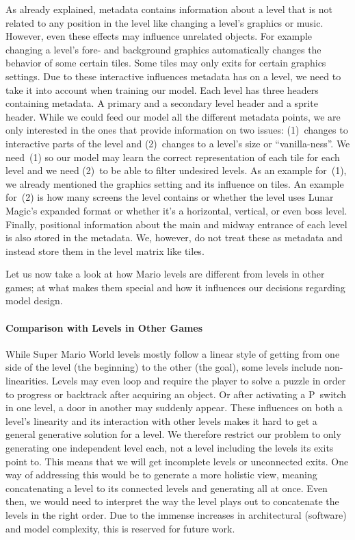 As already explained, metadata contains information about a level that
is not related to any position in the level like changing a level's
graphics or music. However, even these effects may influence unrelated
objects. For example changing a level's fore- and background graphics
automatically changes the behavior of some certain tiles. Some tiles
may only exits for certain graphics settings. Due to these interactive
influences metadata has on a level, we need to take it into account
when training our model. Each level has three headers containing
metadata. A primary and a secondary level header and a sprite header.
While we could feed our model all the different metadata points, we
are only interested in the ones that provide information on two
issues: (1)~changes to interactive parts of the level and (2)~changes
to a level's size or ``vanilla-ness''. We need~(1) so our model may
learn the correct representation of each tile for each level and we
need (2)~to be able to filter undesired levels. As an example for~(1),
we already mentioned the graphics setting and its influence on tiles.
An example for~(2) is how many screens the level contains or whether
the level uses Lunar Magic's expanded format or whether it's a
horizontal, vertical, or even boss level. \\
Finally, positional information about the main and midway entrance of
each level is also stored in the metadata. We, however, do not treat
these as metadata and instead store them in the level matrix like
tiles.

Let us now take a look at how Mario levels are different from levels
in other games; at what makes them special and how it influences our
decisions regarding model design.

\paragraph{Comparison with Levels in Other Games}

While Super Mario World levels mostly follow a linear style of getting
from one side of the level (the beginning) to the other (the goal),
some levels include non-linearities. Levels may even loop and require
the player to solve a puzzle in order to progress or backtrack after
acquiring an object. Or after activating a P~switch in one level, a
door in another may suddenly appear. These influences on both a
level's linearity and its interaction with other levels makes it hard
to get a general generative solution for a level. We therefore
restrict our problem to only generating one independent level each,
not a level including the levels its exits point to. This means that
we will get incomplete levels or unconnected exits. One way of
addressing this would be to generate a more holistic view, meaning
concatenating a level to its connected levels and generating all at
once. Even then, we would need to interpret the way the level plays
out to concatenate the levels in the right order. Due to the immense
increases in architectural (software) and model complexity, this is
reserved for future work.

